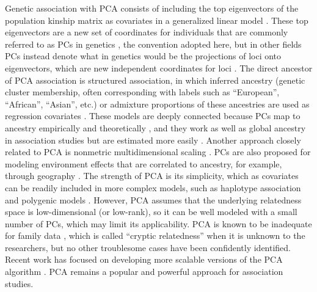 \documentclass[11pt]{article}
\begin{document}
\begin{linenumbers}
Genetic association with PCA consists of including the top eigenvectors of the population kinship matrix as covariates in a generalized linear model \citep{zhang_semiparametric_2003, price_principal_2006, bouaziz_accounting_2011}.
These top eigenvectors are a new set of coordinates for individuals that are commonly referred to as PCs in genetics \citep{patterson_population_2006}, the convention adopted here, but in other fields PCs instead denote what in genetics would be the projections of loci onto eigenvectors, which are new independent coordinates for loci \citep{jolliffe_principal_2002}.
The direct ancestor of PCA association is structured association, in which inferred ancestry (genetic cluster membership, often corresponding with labels such as ``European'', ``African'', ``Asian'', etc.) or admixture proportions of these ancestries are used as regression covariates \citep{pritchard_association_2000}.
These models are deeply connected because PCs map to ancestry empirically \citep{alexander_fast_2009, zhou_strong_2016} and theoretically \citep{mcvean_genealogical_2009,zheng_eigenanalysis_2016,cabreros_likelihood-free_2019,chiu_inferring_2022}, and they work as well as global ancestry in association studies but are estimated more easily \citep{patterson_population_2006, zhao_arabidopsis_2007, alexander_fast_2009, bouaziz_accounting_2011}.
Another approach closely related to PCA is nonmetric multidimensional scaling \citep{zhu_nonmetric_2009}.
PCs are also proposed for modeling environment effects that are correlated to ancestry, for example, through geography \citep{novembre_genes_2008, zhang_principal_2015, lin_admixed_2021}.
The strength of PCA is its simplicity, which as covariates can be readily included in more complex models, such as haplotype association \citep{xu_detecting_2014} and polygenic models \citep{qian_fast_2020}.
However, PCA assumes that the underlying relatedness space is low-dimensional (or low-rank), so it can be well modeled with a small number of PCs, which may limit its applicability.
PCA is known to be inadequate for family data \citep{patterson_population_2006, zhu_nonmetric_2009, thornton_roadtrips:_2010, price_new_2010}, which is called ``cryptic relatedness'' when it is unknown to the researchers, but no other troublesome cases have been confidently identified.
Recent work has focused on developing more scalable versions of the PCA algorithm \citep{lee_sparse_2012, abraham_fast_2014, galinsky_fast_2016, abraham_flashpca2:_2017, agrawal_scalable_2020}.
PCA remains a popular and powerful approach for association studies.


\end{linenumbers}
\end{document}
